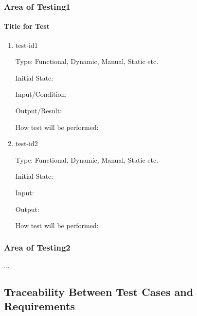 \documentclass[12pt, titlepage]{article}
\begin{document}


\subsubsection{Area of Testing1}
		
\paragraph{Title for Test}

\begin{enumerate}

\item{test-id1\\}

Type: Functional, Dynamic, Manual, Static etc.
					
Initial State: 
					
Input/Condition: 
					
Output/Result: 
					
How test will be performed: 
					
\item{test-id2\\}

Type: Functional, Dynamic, Manual, Static etc.
					
Initial State: 
					
Input: 
					
Output: 
					
How test will be performed: 

\end{enumerate}

\subsubsection{Area of Testing2}

...

\subsection{Traceability Between Test Cases and Requirements}

\end{document}
